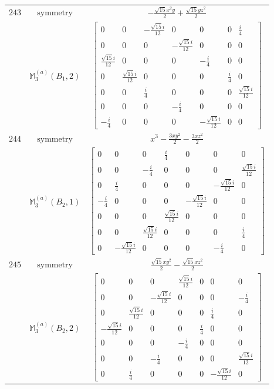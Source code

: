 \documentclass[fleqn,8pt,landscape]{jsarticle}
\begin{document}
\begin{longtable}{ccc}
$ 243 $ & $ \text{symmetry} $ & $ - \frac{\sqrt{15} x^{2} y}{2} + \frac{\sqrt{15} y z^{2}}{2} $ \\
$  $ & $ \mathbb{M}_{3}^{(a)}(B_{1},2) $ & $ \begin{bmatrix} 0 & 0 & - \frac{\sqrt{15} i}{12} & 0 & 0 & 0 & \frac{i}{4} \\ 0 & 0 & 0 & - \frac{\sqrt{15} i}{12} & 0 & 0 & 0 \\ \frac{\sqrt{15} i}{12} & 0 & 0 & 0 & - \frac{i}{4} & 0 & 0 \\ 0 & \frac{\sqrt{15} i}{12} & 0 & 0 & 0 & \frac{i}{4} & 0 \\ 0 & 0 & \frac{i}{4} & 0 & 0 & 0 & \frac{\sqrt{15} i}{12} \\ 0 & 0 & 0 & - \frac{i}{4} & 0 & 0 & 0 \\ - \frac{i}{4} & 0 & 0 & 0 & - \frac{\sqrt{15} i}{12} & 0 & 0 \end{bmatrix} $ \\ \hline
$ 244 $ & $ \text{symmetry} $ & $ x^{3} - \frac{3 x y^{2}}{2} - \frac{3 x z^{2}}{2} $ \\
$  $ & $ \mathbb{M}_{3}^{(a)}(B_{2},1) $ & $ \begin{bmatrix} 0 & 0 & 0 & \frac{i}{4} & 0 & 0 & 0 \\ 0 & 0 & - \frac{i}{4} & 0 & 0 & 0 & \frac{\sqrt{15} i}{12} \\ 0 & \frac{i}{4} & 0 & 0 & 0 & - \frac{\sqrt{15} i}{12} & 0 \\ - \frac{i}{4} & 0 & 0 & 0 & - \frac{\sqrt{15} i}{12} & 0 & 0 \\ 0 & 0 & 0 & \frac{\sqrt{15} i}{12} & 0 & 0 & 0 \\ 0 & 0 & \frac{\sqrt{15} i}{12} & 0 & 0 & 0 & \frac{i}{4} \\ 0 & - \frac{\sqrt{15} i}{12} & 0 & 0 & 0 & - \frac{i}{4} & 0 \end{bmatrix} $ \\ \hline
$ 245 $ & $ \text{symmetry} $ & $ \frac{\sqrt{15} x y^{2}}{2} - \frac{\sqrt{15} x z^{2}}{2} $ \\
$  $ & $ \mathbb{M}_{3}^{(a)}(B_{2},2) $ & $ \begin{bmatrix} 0 & 0 & 0 & \frac{\sqrt{15} i}{12} & 0 & 0 & 0 \\ 0 & 0 & - \frac{\sqrt{15} i}{12} & 0 & 0 & 0 & - \frac{i}{4} \\ 0 & \frac{\sqrt{15} i}{12} & 0 & 0 & 0 & \frac{i}{4} & 0 \\ - \frac{\sqrt{15} i}{12} & 0 & 0 & 0 & \frac{i}{4} & 0 & 0 \\ 0 & 0 & 0 & - \frac{i}{4} & 0 & 0 & 0 \\ 0 & 0 & - \frac{i}{4} & 0 & 0 & 0 & \frac{\sqrt{15} i}{12} \\ 0 & \frac{i}{4} & 0 & 0 & 0 & - \frac{\sqrt{15} i}{12} & 0 \end{bmatrix} $ \\ \hline

\end{longtable}
\end{document}
